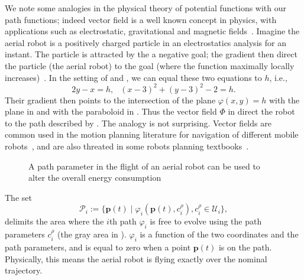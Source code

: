 We note some analogies in the physical theory of potential functions with our path functions; indeed vector field is a well known concept in physics, with applications such as electrostatic, gravitational and magnetic fields~\citep{feynman2015feynman}. Imagine the aerial robot is a positively charged particle in an electrostatics analysis for an instant. The particle is attracted by the a negative goal; the gradient then direct the particle (the aerial robot) to the goal (where the function maximally locally increases)~\citep{choset2005principles}. In the setting of  and , we can equal these two equations to $h$, i.e., 
\begin{equation}\label{eq:two-paths}
  2y-x=h,\,\,\,\ (x-3)^2+(y-3)^2-2=h.
\end{equation}
Their gradient then points to the intersection of the plane $\varphi(x,y)=h$ with the plane in  and with the paraboloid in . Thus the vector field $\varPhi$ in  direct the robot to the path described by .
The analogy is not surprising. Vector fields are common used in the motion planning literature for navigation of different mobile robots~\citep{lindemann2005smoothly,gonccalves2010vector,panagou2014motion,zhou2014vector,kapitanyuk2017guiding,de2017guidance}, and are also threated in some robots planning textbooks~\citep{choset2005principles,lavalle2006planning}.

\begin{figure}[h]
  \centering
  
  \caption[Path parameter in the flight of an aerial robot]{A path parameter in the flight of an aerial robot can be used to alter the overall energy consumption}
  \label{fig:tee1}
\end{figure}
%  

The set
\begin{equation}\label{eq:area}
  \mathcal{P}_i:=\{\mathbf{p}(t)\mid\varphi_i(\mathbf{p}(t),c_{i}^\rho),c_i^\rho\in\mathcal{U}_i\},
\end{equation}
delimits the area where the $i$th path $\varphi_i$ is free to evolve using the path parameters $c_i^\rho$ (the gray area in ). $\varphi_i$ is a function of the two coordinates and the path parameters, and is equal to zero when a point $\mathbf{p}(t)$ is on the path. Physically, this means the aerial robot is flying exactly over the nominal trajectory. 

